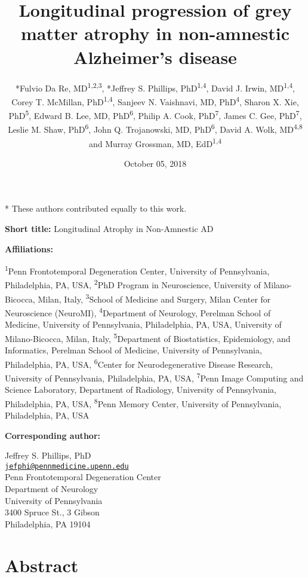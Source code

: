 \documentclass[]{article}
\title{Longitudinal progression of grey matter atrophy in non-amnestic
Alzheimer's disease}
\author{*Fulvio Da Re, MD\textsuperscript{1,2,3}, *Jeffrey S. Phillips,
PhD\textsuperscript{1,4}, David J. Irwin, MD\textsuperscript{1,4}, Corey
T. McMillan, PhD\textsuperscript{1,4}, Sanjeev N. Vaishnavi, MD,
PhD\textsuperscript{4}, Sharon X. Xie, PhD\textsuperscript{5}, Edward B.
Lee, MD, PhD\textsuperscript{6}, Philip A. Cook, PhD\textsuperscript{7},
James C. Gee, PhD\textsuperscript{7}, Leslie M. Shaw,
PhD\textsuperscript{6}, John Q. Trojanowski, MD, PhD\textsuperscript{6},
David A. Wolk, MD\textsuperscript{4,8} and Murray Grossman, MD,
EdD\textsuperscript{1,4}}
\date{October 05, 2018}
\begin{document}
\maketitle


* These authors contributed equally to this work.

\textbf{Short title:} Longitudinal Atrophy in Non-Amnestic AD

\textbf{Affiliations:}

\textsuperscript{1}Penn Frontotemporal Degeneration Center, University
of Pennsylvania, Philadelphia, PA, USA, \textsuperscript{2}PhD Program
in Neuroscience, University of Milano-Bicocca, Milan, Italy,
\textsuperscript{3}School of Medicine and Surgery, Milan Center for
Neuroscience (NeuroMI), \textsuperscript{4}Department of Neurology,
Perelman School of Medicine, University of Pennsylvania, Philadelphia,
PA, USA, University of Milano-Bicocca, Milan, Italy,
\textsuperscript{5}Department of Biostatistics, Epidemiology, and
Informatics, Perelman School of Medicine, University of Pennsylvania,
Philadelphia, PA, USA, \textsuperscript{6}Center for Neurodegenerative
Disease Research, University of Pennsylvania, Philadelphia, PA, USA,
\textsuperscript{7}Penn Image Computing and Science Laboratory,
Department of Radiology, University of Pennsylvania, Philadelphia, PA,
USA, \textsuperscript{8}Penn Memory Center, University of Pennsylvania,
Philadelphia, PA, USA

\textbf{Corresponding author:}

Jeffrey S. Phillips, PhD\\
\href{mailto:jefphi@pennmedicine.upenn.edu}{\nolinkurl{jefphi@pennmedicine.upenn.edu}}\\
Penn Frontotemporal Degeneration Center\\
Department of Neurology\\
University of Pennsylvania\\
3400 Spruce St., 3 Gibson\\
Philadelphia, PA 19104

\newpage


\section*{Abstract}\label{abstract}
\end{document}
